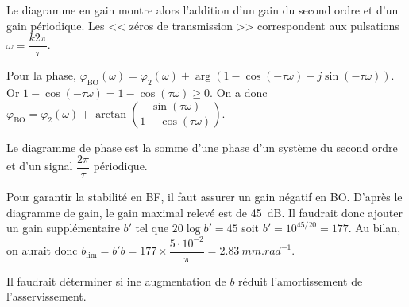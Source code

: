 \begin{corrige}
Le diagramme en gain montre alors l'addition d'un gain du second ordre et d'un gain périodique. Les << zéros de transmission >> correspondent aux pulsations $\omega=\dfrac{k2\pi }{\tau}$.

Pour la phase, $\varphi_{\text{BO}}\left( \omega\right)=\varphi_2\left( \omega\right)+\arg\left( 1-\cos\left( -\tau\omega\right) - j\sin\left(-\tau\omega\right)\right)$. Or $1-\cos\left( -\tau\omega\right) = 1-\cos\left( \tau \omega \right) \geq 0$. On a donc 
 $\varphi_{\text{BO}}=\varphi_2\left( \omega\right)+\arctan \left(\dfrac{\sin\left( \tau\omega\right)}{1-\cos\left( \tau\omega\right)} \right)$.

Le diagramme de  phase est la somme d'une phase d'un système du second ordre et d'un signal $\dfrac{2\pi}{\tau}$ périodique. 
\end{corrige}
\else
\fi

\ifprof
\begin{corrige}
Pour garantir la stabilité en BF, il faut assurer un gain négatif en BO. D'après le diagramme de gain, le gain maximal relevé est de \SI{45}{dB}. Il faudrait donc ajouter un gain supplémentaire $b'$ tel que $20\log b' = 45$ soit $b'=10^{45/20}=177$. Au bilan, on aurait donc $b_{\text{lim}}=b' b = 177\times \dfrac{5\cdot 10^{-2}}{\pi}=
\SI{2,83}{mm.rad^{-1}}$.

Il faudrait déterminer si ine augmentation de $b$ réduit l'amortissement de l'asservissement. 

\end{corrige}
\else
\fi
